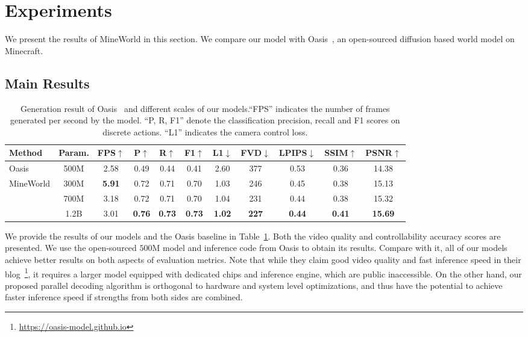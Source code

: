 \documentclass{article} %
\begin{document}
\section{Experiments}
\label{sec:exp}

We present the results of MineWorld in this section. We compare our model with Oasis~\citep{oasis2024}, an open-sourced diffusion based world model on Minecraft.

\subsection{Main Results}

\begin{table}[tb]
\begin{center}
\small
\caption{Generation result of Oasis~\citep{oasis2024} and different scales of our models.``FPS'' indicates the number of frames generated per second by the model. ``P, R, F1'' denote the classification precision, recall and F1 scores on discrete actions. ``L1'' indicates the camera control loss.}
	\label{tab:main_results}
        \setlength\tabcolsep{6pt}
	\begin{tabular}{lc|c|cccc|cccc}
		\toprule[1pt]
		Method  & Param. & FPS$\uparrow$ & P$\uparrow$ & R$\uparrow$ & F1$\uparrow$ &  L1$\downarrow$ & FVD$\downarrow$  &  LPIPS$\downarrow$ & SSIM$\uparrow$ & PSNR$\uparrow$   \\
		\midrule
		Oasis & 500M & 2.58 & 0.49 & 0.44 & 0.41 & 2.60 & 377 & 0.53 & 0.36 & 14.38 \\ 
        \midrule
		\multirow{3}{*}{MineWorld} & 300M & \textbf{5.91} & 0.72 & 0.71 & 0.70 & 1.03 & 246 & 0.45 & 0.38 & 15.13  \\
		       & 700M & 3.18 & 0.72 & 0.71  & 0.70 & 1.04 & 231 & 0.44 & 0.38 & 15.32  \\
		       & 1.2B & 3.01 & \textbf{0.76} & \textbf{0.73} & \textbf{0.73} & \textbf{1.02}  &  \textbf{227} & \textbf{0.44} & \textbf{0.41} & \textbf{15.69}   \\
		\bottomrule[1pt]
	\end{tabular}
 \vspace{-3mm}
\end{center}
\end{table}

We provide the results of our models and the Oasis baseline in Table~\ref{tab:main_results}. Both the video quality and controllability accuracy scores are presented. 
We use the open-sourced $500$M model and inference code from Oasis to obtain its results. Compare with it, all of our models achieve better results on both aspects of evaluation metrics. Note that while they claim good video quality and fast inference speed in their blog~\footnote{\url{https://oasis-model.github.io}}, it requires a larger model equipped with dedicated chips and inference engine, which are public inaccessible. On the other hand, our proposed parallel decoding algorithm is orthogonal to hardware and system level optimizations, and thus have the potential to achieve faster inference speed if strengths from both sides are combined.
\end{document}
